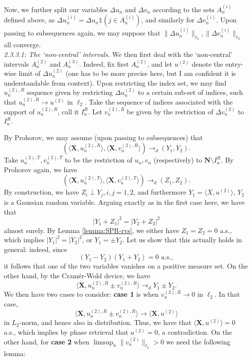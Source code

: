 \documentclass[a4paper,12pt]{amsart}
\numberwithin{equation}{section}
\newcommand{\N}{\mathbf N}
\newcommand{\X}{\mathbf X}
\begin{document}
 Now, we further split our variables $\Delta u_n$ and $\Delta v_n$ according to the sets $A_n^{(i)}$ defined above, as $\Delta u_n^{(i)} = \Delta u_n \mathds{1} (j \in A_n^{(i)})$, and similarly for $\Delta v_n^{(i)}$. Upon passing to subsequences again, we may suppose that $\|\Delta u_n^{(i)}\|_{\ell_2},\|\Delta v_n^{(i)}\|_{\ell_2}$ all converge. \\

\noindent\textit{2.3.3.1: The `non-central' intervals.} We then first deal with the `non-central' intervals $A_n^{(2)}$ and $A_n^{(3)}$. Indeed, fix first $A_n^{(2)}$, and let $u^{(2)}$ denote the entry-wise limit of $\Delta u_n^{(2)}$ (one has to be more precise here, but I am confident it is understandable from context). Upon restricting the index set, we may find $u_n^{(2),R}$ sequence given by restricting $\Delta u_n^{(2)}$ to a certain sub-set of indices, such that $u_n^{(2),R} \to u^{(2)}$ in $\ell_2$. Take the sequence of indices associated with the support of $u_n^{(2),R}$, call it $I_n^{R}$. Let $v_n^{(2),R}$ be given by the restriction of $\Delta v_n^{(2)}$ to $I_n^{R}$. 

 By Prohorov, we may assume (upon passing to subsequences) that 
 \[
( \langle \X, u_n^{(2),R}\rangle, \langle \X, v_n^{(2),R} \rangle) \to_d (Y_1,Y_2). 
 \]
 Take $u_n^{(2),T}, v_n^{(2),T}$ to be the restriction of $u_n,v_n$ (respectively) to  $\N \setminus I_n^{R}$. By Prohorov again, we have 
 \[
 ( \langle \X, u_n^{(2),T}\rangle, \langle \X, v_n^{(2),T} \rangle) \to_d (Z_1,Z_2). 
 \]
 By construction, we have $Z_i \perp Y_j, i,j=1,2$, and furthermore $Y_1 = \langle X,u^{(2)}\rangle$, $Y_2$ is a Gaussian random variable. Arguing exactly as in the first case here, we have that 
 \[
 |Y_1 + Z_1|^2 = |Y_2 + Z_2|^2
 \]
 almost surely. By Lemma \ref{lemma:SPR-rvs}, we either have $Z_1 = Z_2 = 0$ a.s., which implies $|Y_1|^2 = |Y_2|^2$, or $Y_1 = \pm Y_2$. Let us show that this actually holds in general: indeed, since 
 \[
 (Y_1 - Y_2)(Y_1 + Y_2) = 0 \text{ a.s.}, 
 \]
 it follows that one of the two variables vanishes on a positive measure set. On the other hand, by the Cram\'er-Wold device, we have 
 \[
 \langle \X, u_n^{(2),R}\pm v_n^{(2),R}\rangle \to_d Y_1 \pm Y_2. 
 \]
 We then have two cases to consider: \textbf{case 1} is when $v_n^{(2),R} \to 0$ in $\ell_2$. In that case, 
 \[
 \langle \X, u_n^{(2),R}\pm v_n^{(2),R}\rangle \to \langle \X, u^{(2)} \rangle 
 \]
    in $L_2$-norm, and hence also in distribution. Thus, we have that $\langle \X, u^{(2)} \rangle = 0$ a.s., which implies by phase retrieval that $u^{(2)} = 0$, a contradiction. On the other hand, for \textbf{case 2} when $\limsup_n \|v_n^{(2)}\|_{\ell_2} > 0$ we need the following lemma: 
\end{document}
